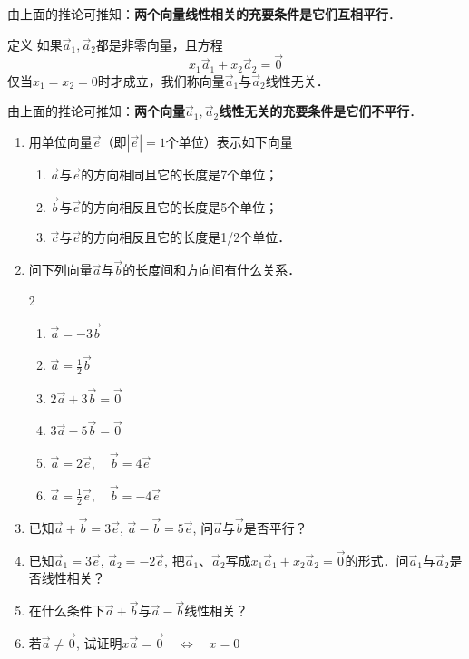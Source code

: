 由上面的推论可推知：\textbf{两个向量线性相关的充要条件是它们互相平行}．

\begin{blk}
    {定义} 如果$\vec{a}_1,\vec{a}_2$都是非零向量，且方程
    \[x_1\vec{a}_1+x_2\vec{a}_2=\vec{0}\]
仅当$x_1=x_2=0$时才成立，我们称向量$\vec{a}_1$与$\vec{a}_2$线性无关．
\end{blk}

由上面的推论可推知：\textbf{两个向量$\vec{a}_1,\vec{a}_2$线性无关的充要条件是它们不平行}．

\begin{ex}
\begin{enumerate}
    \item 用单位向量$\vec{e}$（即$|\vec{e}|=1$个单位）表示如下向量
\begin{enumerate}
    \item $\vec{a}$与$\vec{e}$的方向相同且它的长度是7个单位；
    \item $\vec{b}$与$\vec{e}$的方向相反且它的长度是5个单位；
    \item $\vec{c}$与$\vec{e}$的方向相反且它的长度是1/2个单位．
\end{enumerate} 
\item 问下列向量$\vec{a}$与$\vec{b}$的长度间和方向间有什么关系．
\begin{multicols}{2}
\begin{enumerate}
    \item $\vec{a}=-3\vec{b}$
    \item $\vec{a}=\frac{1}{2}\vec{b}$
    \item $2\vec{a}+3\vec{b}=\vec{0}$
    \item $3\vec{a}-5\vec{b}=\vec{0}$
    \item $\vec{a}=2\vec{e},\quad \vec{b}=4\vec{e}$
    \item $\vec{a}=\frac{1}{2}\vec{e},\quad \vec{b}=-4\vec{e}$
\end{enumerate}
\end{multicols}
\item 已知$\vec{a}+\vec{b}=3\vec{e}$, $\vec{a}-\vec{b}=5\vec{e}$, 问$\vec{a}$与$\vec{b}$是否平行？
\item 已知$\vec{a}_1=3\vec{e}$, $\vec{a}_2=-2\vec{e}$, 把$\vec{a}_1$、$\vec{a}_2$写成$x_1\vec{a}_1+x_2\vec{a}_2=\vec{0}$的形式．问$\vec{a}_1$与$\vec{a}_2$是否线性相关？
\item 在什么条件下$\vec{a}+\vec{b}$与$\vec{a}-\vec{b}$线性相关？
\item 若$\vec{a}\ne \vec{0}$, 试证明$x\vec{a}=\vec{0}\quad \Leftrightarrow\quad x=0$
\end{enumerate}  
\end{ex}

